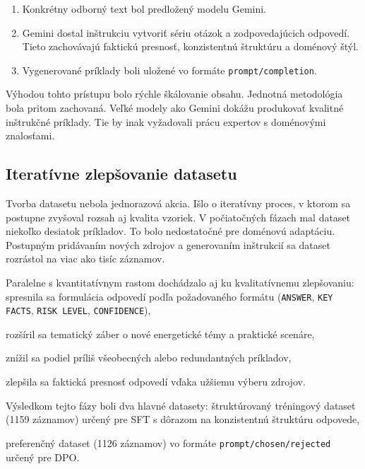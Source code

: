 \begin{enumerate}
    \item Konkrétny odborný text bol predložený modelu Gemini.
    \item Gemini dostal inštrukciu vytvoriť sériu otázok a zodpovedajúcich odpovedí. Tieto zachovávajú faktickú presnosť, konzistentnú štruktúru a doménový štýl.
    \item Vygenerované príklady boli uložené vo formáte \texttt{prompt/completion}.
\end{enumerate}
 
Výhodou tohto prístupu bolo rýchle škálovanie obsahu. Jednotná metodológia bola pritom zachovaná. Veľké modely ako Gemini dokážu produkovať kvalitné inštrukčné príklady. Tie by inak vyžadovali prácu expertov s doménovými znalosťami.
 
\subsection{Iteratívne zlepšovanie datasetu}
 
Tvorba datasetu nebola jednorazová akcia. Išlo o iteratívny proces, v ktorom sa postupne zvyšoval rozsah aj kvalita vzoriek. V počiatočných fázach mal dataset niekoľko desiatok príkladov. To bolo nedostatočné pre doménovú adaptáciu. Postupným pridávaním nových zdrojov a generovaním inštrukcií sa dataset rozrástol na viac ako tisíc záznamov.
 
Paralelne s kvantitatívnym rastom dochádzalo aj ku kvalitatívnemu zlepšovaniu:
\noindent spresnila sa formulácia odpovedí podľa požadovaného formátu (\texttt{ANSWER}, \texttt{KEY FACTS}, \texttt{RISK LEVEL}, \texttt{CONFIDENCE}),\par\medskip
\noindent rozšíril sa tematický záber o nové energetické témy a praktické scenáre,\par\medskip
\noindent znížil sa podiel príliš všeobecných alebo redundantných príkladov,\par\medskip
\noindent zlepšila sa faktická presnosť odpovedí vďaka užšiemu výberu zdrojov.\par\medskip
 
Výsledkom tejto fázy boli dva hlavné datasety:
\noindent štruktúrovaný tréningový dataset (1159 záznamov) určený pre SFT s dôrazom na konzistentnú štruktúru odpovede,\par\medskip
\noindent preferenčný dataset (1126 záznamov) vo formáte \texttt{prompt/chosen/rejected} určený pre DPO.\par\medskip
 
